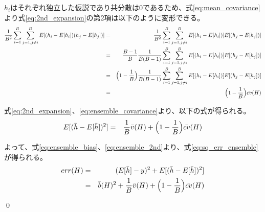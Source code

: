 \documentclass{jsarticle}
\begin{document}
$h_i$はそれぞれ独立した仮説であり共分散は0であるため、式\ref{eq:mean_covariance}より式\ref{eq:2nd_expansion}の第2項は以下のように変形できる。
\begin{eqnarray}
    \frac{1}{B^2}\sum_{i=1}^B\sum_{j=1,j\neq i}^B{E[(h_i-E[h_i])(h_j-E[h_j])]} &=& \frac{1}{B^2}\sum_{i=1}^B\sum_{j=1,j\neq i}^B{E[(h_i-E[h_i])]E[(h_j-E[h_j])]} \nonumber \\
    &=& \frac{B-1}{B}\frac{1}{B(B-1)}\sum_{i=1}^B\sum_{j=1,j\neq i}^B{E[(h_i-E[h_i])]E[(h_j-E[h_j])]} \nonumber \\
    &=& \Bigl(1-\frac{1}{B}\Bigr)\frac{1}{B(B-1)}\sum_{i=1}^B\sum_{j=1,j\neq i}^B{E[(h_i-E[h_i])]E[(h_j-E[h_j])]} \nonumber \\
    \label{eq:ensemble_covariance}
    &=& \Bigl(1-\frac{1}{B}\Bigr)\bar{cv}(H)
\end{eqnarray}

式\ref{eq:2nd_expansion}、\ref{eq:ensemble_covariance}より、以下の式が得られる。
\begin{eqnarray}
    \label{eq:ensemble_2nd}
    E[(\bar{h}-E[\bar{h}])^2] &=& \frac{1}{B}\bar{v}(H)+ \Bigl(1-\frac{1}{B}\Bigr)\bar{cv}(H)
\end{eqnarray}

よって、式\ref{eq:ensemble_bias}、\ref{eq:ensemble_2nd}より、式\ref{eq:sq_err_ensemble}が得られる。
\begin{eqnarray}
    err(H) &=& (E[\bar{h}]-y)^2+E[(\bar{h}-E[\bar{h}])^2] \nonumber \\
    &=&  \bar{b}(H)^2 + \frac{1}{B}\bar{v}(H)+ \Bigl(1-\frac{1}{B}\Bigr)\bar{cv}(H) \nonumber
\end{eqnarray}

\qed
\end{document}
